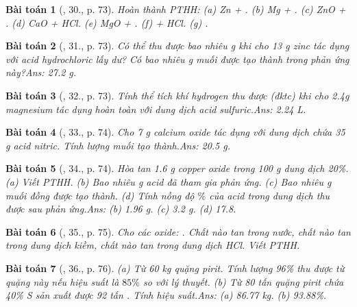 \documentclass{article}
\newtheorem{baitoan}{Bài toán}
\begin{document}
\begin{baitoan}[\cite{An_Hoa_Hoc_nang_cao_8_9}, 30., p. 73]
	Hoàn thành {\rm PTHH}: (a) {\rm Zn + }. (b) {\rm Mg + }. (c) {\rm ZnO + }. (d) {\rm CaO + HCl}. (e) {\rm MgO + }. (f) {\rm{} + HCl}. (g) {\rm{}}.
\end{baitoan}

\begin{baitoan}[\cite{An_Hoa_Hoc_nang_cao_8_9}, 31., p. 73]
	Có thể thu được bao nhiêu {\rm g } khi cho {\rm13 g} zinc tác dụng với acid hydrochloric lấy dư? Có bao nhiêu {\rm g} muối được tạo thành trong phản ứng này?\hfill{\sf Ans: 27.2 g.}
\end{baitoan}

\begin{baitoan}[\cite{An_Hoa_Hoc_nang_cao_8_9}, 32., p. 73]
	Tính thể tích khí hydrogen thu được (đktc) khi cho {\rm2.4g} magnesium tác dụng hoàn toàn với dung dịch acid sulfuric.\hfill{\sf Ans: 2.24 L.}
\end{baitoan}

\begin{baitoan}[\cite{An_Hoa_Hoc_nang_cao_8_9}, 33., p. 74]
	Cho {\rm7 g} calcium oxide tác dụng với dung dịch chứa {\rm35 g} acid nitric. Tính lượng muối tạo thành.\hfill{\sf Ans: 20.5 g.}
\end{baitoan}

\begin{baitoan}[\cite{An_Hoa_Hoc_nang_cao_8_9}, 34., p. 74]
	Hòa tan {\rm1.6 g} copper oxide trong {\rm100 g} dung dịch {\rm{} 20\%}. (a) Viết {\rm PTHH}. (b) Bao nhiêu {\rm g} acid đã tham gia phản ứng. (c) Bao nhiêu {\rm g} muối đồng được tạo thành. (d) Tính nồng độ $\%$ của acid trong dung dịch thu được sau phản ứng.\hfill{\sf Ans: (b) 1.96 g. (c) 3.2 g. (d) 17.8.}
\end{baitoan}

\begin{baitoan}[\cite{An_Hoa_Hoc_nang_cao_8_9}, 35., p. 75]
	Cho các oxide: {\rm{}}. Chất nào tan trong nước, chất nào tan trong dung dịch kiềm, chất nào tan trong dung dịch {\rm HCl}. Viết {\rm PTHH}.
\end{baitoan}

\begin{baitoan}[\cite{An_Hoa_Hoc_nang_cao_8_9}, 36., p. 76]
	(a) Từ {\rm60 kg} quặng pirit. Tính lượng {\rm{} 96\%} thu được từ quặng này nếu hiệu suất là $85\%$ so với lý thuyết. (b) Từ {\rm80} tấn quặng pirit chứa {\rm40\% S} sản xuất được {\rm92} tấn {\rm{}}. Tính hiệu suất.\hfill{\sf Ans: (a) 86.77 kg. (b) 93.88\%.}
\end{baitoan}
\end{document}
